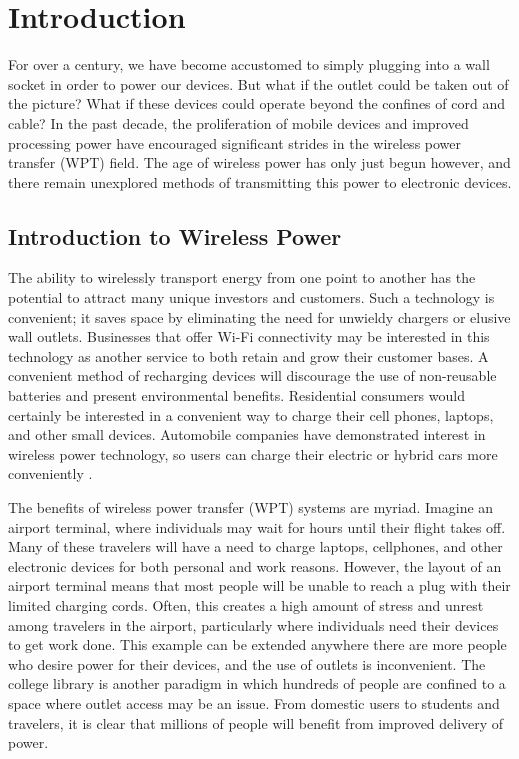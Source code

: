 \chapter{Introduction}
\label{ch:introduction}

For over a century, we have become accustomed to simply plugging into a wall socket in order to power our devices. But what if the outlet could be taken out of the picture? What if these devices could operate beyond the confines of cord and cable? In the past decade, the proliferation of mobile devices and improved processing power have encouraged significant strides in the wireless power transfer (WPT) field. The age of wireless power has only just begun however, and there remain unexplored methods of transmitting this power to electronic devices.

\section{Introduction to Wireless Power}
The ability to wirelessly transport energy from one point to another has the potential to attract many unique investors and customers. Such a technology is convenient; it saves space by eliminating the need for unwieldy chargers or elusive wall outlets. Businesses that offer Wi-Fi connectivity may be interested in this technology as another service to both retain and grow their customer bases. A convenient method of recharging devices will discourage the use of non-reusable batteries and present environmental benefits. Residential consumers would certainly be interested in a convenient way to charge their cell phones, laptops, and other small devices. Automobile companies have demonstrated interest in wireless power technology, so users can charge their electric or hybrid cars more conveniently \cite{ToyotaNews}\cite{VolvoNews}.

The benefits of wireless power transfer (WPT) systems are myriad. Imagine an airport terminal, where individuals may wait for hours until their flight takes off. Many of these travelers will have a need to charge laptops, cellphones, and other electronic devices for both personal and work reasons. However, the layout of an airport terminal means that most people will be unable to reach a plug with their limited charging cords. Often, this creates a high amount of stress and unrest among travelers in the airport, particularly where individuals need their devices to get work done. This example can be extended anywhere there are more people who desire power for their devices, and the use of outlets is inconvenient. The college library is another paradigm in which hundreds of people are confined to a space where outlet access may be an issue. From domestic users to students and travelers, it is clear that millions of people will benefit from improved delivery of power.

